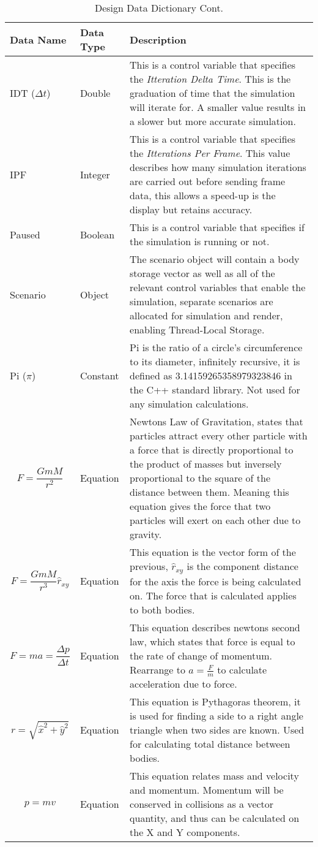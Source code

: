 \begin{table}[H]
\caption{Design Data Dictionary Cont.}
\centering
\footnotesize
\def\arraystretch{1.5}
\begin{tabular}{|M{3cm}|M{3cm}|m{8cm}|}
\hline 
\textbf{Data Name} & \textbf{Data Type} & \textbf{Description} \\ \hline
IDT ($\Delta t$) & Double & This is a control variable that specifies the \textit{Itteration Delta Time}. This is the graduation of time that the simulation will iterate for. A smaller value results in a slower but more accurate simulation. \\ \hline
IPF & Integer & This is a control variable that specifies the \textit{Itterations Per Frame}. This value describes how many simulation iterations are carried out before sending frame data, this allows a speed-up is the display but retains accuracy. \\ \hline
Paused & Boolean & This is a control variable that specifies if the simulation is running or not. \\ \hline
Scenario & Object & The scenario object will contain a body storage vector as well as all of the relevant control variables that enable the simulation, separate scenarios are allocated for simulation and render, enabling Thread-Local Storage. \\ \hline
Pi ($\pi$)& Constant & Pi is the ratio of a circle's circumference to its diameter, infinitely recursive, it is defined as 3.14159265358979323846 in the C++ standard library. Not used for any simulation calculations. \\ \hline
$$F=\frac{GmM}{r^2}$$ & Equation & Newtons Law of Gravitation, states that particles attract every other particle with a force that is directly proportional to the product of masses but inversely proportional to the square of the distance between them. Meaning this equation gives the force that two particles will exert on each other due to gravity. \\ \hline
$$F=\frac{GmM}{r^3}\hat{r}_{xy}$$ & Equation & This equation is the vector form of the previous, $\hat{r}_{xy}$ is the component distance for the axis the force is being calculated on. The force that is calculated applies to both bodies. \\ \hline
$$F=ma=\frac{\Delta p}{\Delta t}$$ & Equation & This equation describes newtons second law, which states that force is equal to the rate of change of momentum. Rearrange to $a=\frac{F}{m}$ to calculate acceleration due to force. \\ \hline
$$r=\sqrt{\hat{x}^2+\hat{y}^2}$$ & Equation & This equation is Pythagoras theorem, it is used for finding a side to a right angle triangle when two sides are known. Used for calculating total distance between bodies. \\ \hline
$$p=mv$$ & Equation & This equation relates mass and velocity and momentum. Momentum will be conserved in collisions as a vector quantity, and thus can be calculated on the X and Y components. \\ \hline
\end{tabular}
\end{table} 

